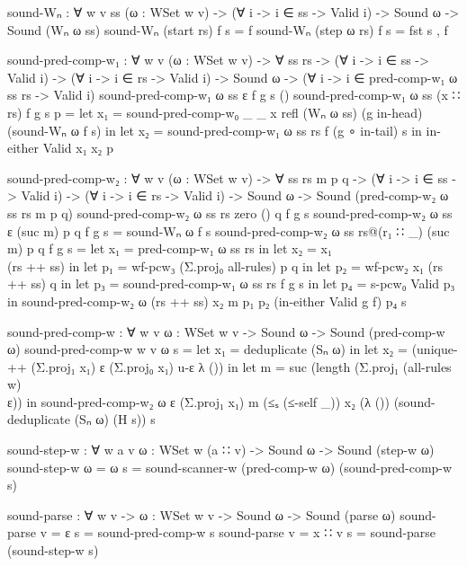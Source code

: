 \begin{code}
			sound-Wₙ : ∀ {w v ss} (ω : WSet w v) ->
			  (∀ {i} -> i ∈ ss -> Valid i) ->
			  Sound ω -> Sound (Wₙ ω ss)
			sound-Wₙ (start rs) f s = f
			sound-Wₙ (step ω rs) f s = fst s , f
			
			sound-pred-comp-w₁ : ∀ {w v} (ω : WSet w v) -> ∀ ss rs ->
			  (∀ {i} -> i ∈ ss -> Valid i) ->
			  (∀ {i} -> i ∈ rs -> Valid i) ->
			  Sound ω -> (∀ {i} -> i ∈ pred-comp-w₁ ω ss rs -> Valid i)
			sound-pred-comp-w₁ ω ss ε f g s ()
			sound-pred-comp-w₁ ω ss (x ∷ rs) f g s p =
			  let x₁ = sound-pred-comp-w₀ _ _ x refl (Wₙ ω ss) (g in-head) (sound-Wₙ ω f s) in
			  let x₂ = sound-pred-comp-w₁ ω ss rs f (g ∘ in-tail) s in
			  in-either Valid x₁ x₂ p
			
			sound-pred-comp-w₂ : ∀ {w v} (ω : WSet w v) -> ∀ ss rs m p q ->
			  (∀ {i} -> i ∈ ss -> Valid i) ->
			  (∀ {i} -> i ∈ rs -> Valid i) ->
			  Sound ω -> Sound (pred-comp-w₂ ω ss rs m p q)
			sound-pred-comp-w₂ ω ss rs zero () q f g s
			sound-pred-comp-w₂ ω ss ε (suc m) p q f g s = sound-Wₙ ω f s
			sound-pred-comp-w₂ ω ss rs@(r₁ ∷ _) (suc m) p q f g s =
			  let x₁ = pred-comp-w₁ ω ss rs in
			  let x₂ = x₁ \\ (rs ++ ss) in
			  let p₁ = wf-pcw₃ (Σ.proj₀ all-rules) p q  in
			  let p₂ = wf-pcw₂ x₁ (rs ++ ss) q in
			  let p₃ = sound-pred-comp-w₁ ω ss rs f g s in
			  let p₄ = s-pcw₀ Valid p₃ in
			  sound-pred-comp-w₂ ω (rs ++ ss) x₂ m p₁ p₂ (in-either Valid g f) p₄ s
			
			sound-pred-comp-w : ∀ {w v} {ω : WSet w v} ->
			  Sound ω -> Sound (pred-comp-w ω)
			sound-pred-comp-w {w} {v} {ω} s =
			  let x₁ = deduplicate (Sₙ ω) in
			  let x₂ = (unique-++ (Σ.proj₁ x₁) ε (Σ.proj₀ x₁) u-ε λ ()) in
			  let m = suc (length (Σ.proj₁ (all-rules {w}) \\ ε)) in
			  sound-pred-comp-w₂ ω ε (Σ.proj₁ x₁) m (≤ₛ (≤-self _)) x₂ (λ ())
			    (sound-deduplicate (Sₙ ω) (H s))
			    s
			
			sound-step-w : ∀ {w a v} {ω : WSet w (a ∷ v)} ->
			  Sound ω -> Sound (step-w ω)
			sound-step-w {ω = ω} s = sound-scanner-w (pred-comp-w ω) (sound-pred-comp-w s)
			
			sound-parse : ∀ {w v} -> {ω : WSet w v} ->
			  Sound ω -> Sound (parse ω)
			sound-parse {v = ε} s = sound-pred-comp-w s
			sound-parse {v = x ∷ v} s = sound-parse (sound-step-w s)

		\end{code}
		  
